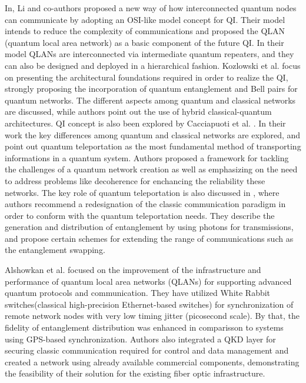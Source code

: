 \documentclass[12pt]{ieeetj}
\begin{document}
		In\cite{li-arch}, Li and co-authors proposed a new way of how interconnected
		quantum nodes can communicate by adopting an OSI-like
		model concept for QI. Their model intends to reduce the complexity of communications
		and proposed the QLAN (quantum local area network) as a basic component of the future QI. In their model
		QLANs are interconnected via intermediate quantum repeaters, and they can also be designed and deployed in
		a hierarchical fashion.
		Kozlowski et al. \cite{rfc} focus on presenting the architectural foundations required in order to
		realize the QI, strongly proposing the incorporation of quantum entanglement and Bell pairs for quantum networks. 
		The different aspects among quantum and classical networks are discussed, while authors point out the use of hybrid
		classical-quantum architectures. QI concept is also been explored by Cacciapuoti et al. \cite{net-chall-dqc}.
		In their work the key differences among quantum and classical
		networks are explored, and point out quantum teleportation as the most fundamental method of transporting 
		informations in a quantum system. Authors proposed a framework for tackling the challenges of a quantum
		network creation as well as emphasizing on the need to address problems like decoherence for enchancing the
		reliability these networks. The key role of quantum teleportation is also discussed in \cite{entagl-classic},
		where authors recommend a redesignation of the classic communication paradigm in order to conform with the quantum teleportation needs.
		They describe the generation and distribution of entanglement by using photons for transmissions, and propose certain schemes for extending
		the range of communications such as the entanglement swapping.
		
		Alshowkan et al.\cite{advance-arch} focused on the improvement of the infrastructure 
		and performance of quantum local area networks (QLANs) for supporting advanced quantum protocols
		and communication. They have utilized White Rabbit switches(classical high-precision Ethernet-based switches) for synchronization
		of remote network nodes with very low timing jitter (picosecond scale). 
		By that, the fidelity of entanglement distribution was enhanced in comparisson to systems using GPS-based synchronization.
		Authors also integrated a QKD layer for securing classic communication required for control and data management and
		created a network using already available commercial components, demonstrating the feasibility of their solution
		for the existing fiber optic infrastructure.
\end{document}
